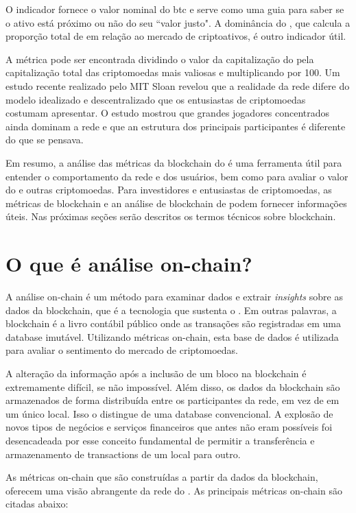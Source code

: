 \documentclass[a4paper,12pt]{article}
\begin{document}
O indicador fornece o valor nominal do btc e serve como uma guia para saber se o ativo 
está próximo ou não do seu ``valor justo". A dominância do \btc, que calcula a proporção 
total de \btcspace em relação ao mercado de criptoativos, é outro indicador útil.

A métrica pode ser encontrada dividindo o valor da capitalização do \btcspace pela capitalização 
total das criptomoedas mais valiosas e multiplicando por 100.
Um estudo recente realizado pelo MIT Sloan revelou que a realidade da rede \btcspace difere do modelo 
idealizado e descentralizado que os entusiastas de criptomoedas costumam apresentar. O estudo 
mostrou que grandes jogadores concentrados ainda dominam a rede e que an estrutura dos principais 
participantes é diferente do que se pensava.

Em resumo, a análise das métricas da blockchain do \btcspace é uma ferramenta útil para entender 
o comportamento da rede e dos usuários, bem como para avaliar o valor do \btcspace e outras criptomoedas. 
Para investidores e entusiastas de criptomoedas, as métricas de blockchain e an análise de blockchain 
de podem fornecer informações úteis. Nas pr\'oximas se\c{c}\~oes ser\~ao descritos os termos t\'ecnicos
sobre blockchain.

\section{O que \'e an\'alise on-chain?}
\hspace{0.5cm}A an\'alise on-chain é um método para examinar dados e extrair \textit{insights} 
sobre as dados da blockchain, que é a tecnologia que sustenta o \btc. Em outras palavras, a blockchain 
é a livro cont\'abil p\'ublico onde as transações são registradas em uma database imut\'avel. 
Utilizando m\'etricas on-chain, esta base de dados é utilizada para avaliar o sentimento do mercado 
de criptomoedas.

A alteração da informação após a inclusão de um bloco na blockchain é extremamente difícil, 
se não impossível. Al\'em disso, os dados da blockchain são armazenados de forma distribu\'ida 
entre os participantes da rede, em vez de em um único local. Isso o distingue de uma database convencional. 
A explosão de novos tipos de negócios e serviços financeiros que antes não eram possíveis foi desencadeada 
por esse conceito fundamental de permitir a transferência e armazenamento de transactions de um local 
para outro.

As m\'etricas on-chain que são construídas a partir da dados da blockchain, oferecem uma visão 
abrangente da rede do \btc. As principais métricas on-chain são citadas abaixo:
\end{document}
